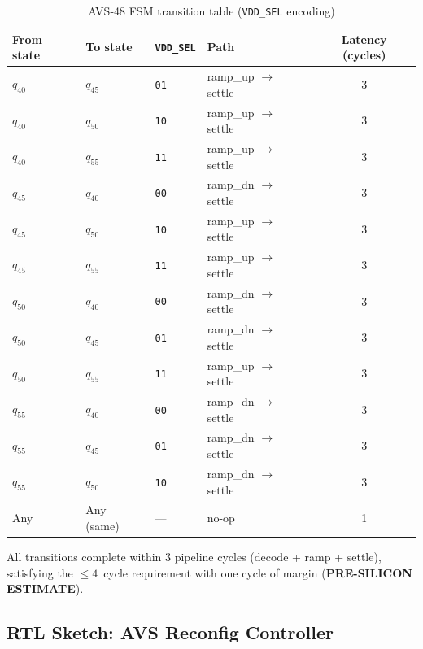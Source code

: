 \begin{table}[ht]
\centering
\caption{AVS-48 FSM transition table (\texttt{VDD\_SEL} encoding)}
\label{tab:fsm_transitions}
\begin{tabular}{llllc}
\hline
From state & To state & \texttt{VDD\_SEL} & Path & Latency (cycles) \\
\hline
$q_{40}$ & $q_{45}$ & \texttt{01} & ramp\_up $\to$ settle & 3 \\
$q_{40}$ & $q_{50}$ & \texttt{10} & ramp\_up $\to$ settle & 3 \\
$q_{40}$ & $q_{55}$ & \texttt{11} & ramp\_up $\to$ settle & 3 \\
$q_{45}$ & $q_{40}$ & \texttt{00} & ramp\_dn $\to$ settle & 3 \\
$q_{45}$ & $q_{50}$ & \texttt{10} & ramp\_up $\to$ settle & 3 \\
$q_{45}$ & $q_{55}$ & \texttt{11} & ramp\_up $\to$ settle & 3 \\
$q_{50}$ & $q_{40}$ & \texttt{00} & ramp\_dn $\to$ settle & 3 \\
$q_{50}$ & $q_{45}$ & \texttt{01} & ramp\_dn $\to$ settle & 3 \\
$q_{50}$ & $q_{55}$ & \texttt{11} & ramp\_up $\to$ settle & 3 \\
$q_{55}$ & $q_{40}$ & \texttt{00} & ramp\_dn $\to$ settle & 3 \\
$q_{55}$ & $q_{45}$ & \texttt{01} & ramp\_dn $\to$ settle & 3 \\
$q_{55}$ & $q_{50}$ & \texttt{10} & ramp\_dn $\to$ settle & 3 \\
Any     & Any (same) & ---        & no-op                & 1 \\
\hline
\end{tabular}
\end{table}

All transitions complete within 3 pipeline cycles (decode + ramp +
settle), satisfying the $\leq 4$~cycle requirement with one cycle
of margin (\textbf{PRE-SILICON ESTIMATE}).

\subsection{RTL Sketch: AVS Reconfig Controller}


